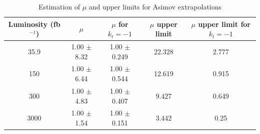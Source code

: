 \begin{table}[ht!]
	\caption{Estimation of $\mu$ and upper limits for Asimov extrapolations}
	\begin{tabular}{|c|c|c|c|c|}
		\hline
		Luminosity (fb$^{-1}$)	&$\mu$ &$\mu$ for $k_t=-1$ &$\mu$ upper limit &$\mu$ upper limit for $k_t=-1$ \\
		\hline
		35.9 & 1.00 $\pm$  8.32 & 1.00 $\pm$  0.249&	22.328 & 2.777   \\
		\hline
		150& 1.00 $\pm$  6.44 & 1.00 $\pm$  0.544  &12.619 &0.915 \\
		\hline
		300&1.00 $\pm$  4.83 &1.00 $\pm$  0.407 & 9.427&0.649 \\
		\hline
		3000&1.00 $\pm$  1.54 & 1.00 $\pm$  0.151&	 3.442 & 0.25
		\\
		\hline
	\end{tabular}
\end{table}



